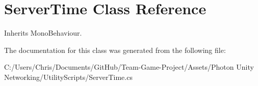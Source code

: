 \hypertarget{class_server_time}{}\section{Server\+Time Class Reference}
\label{class_server_time}


Inherits Mono\+Behaviour.



The documentation for this class was generated from the following file\+:\begin{DoxyCompactItemize}
\item 
C\+:/\+Users/\+Chris/\+Documents/\+Git\+Hub/\+Team-\/\+Game-\/\+Project/\+Assets/\+Photon Unity Networking/\+Utility\+Scripts/Server\+Time.\+cs\end{DoxyCompactItemize}
